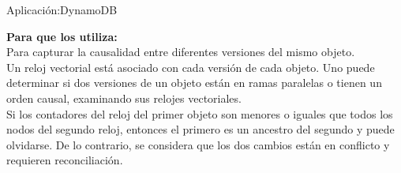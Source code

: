 \begin{frame}[fragile]{Aplicación:}{DynamoDB}
    \justifying

    {\bf Para que los utiliza:}\\[0.3cm]

    Para capturar la causalidad entre diferentes versiones del mismo objeto.\\[0.3cm]

    Un reloj vectorial está asociado con cada versión de cada objeto. Uno puede
    determinar si dos versiones de un objeto están en ramas paralelas o tienen un
    orden causal, examinando sus relojes vectoriales.\\[0.3cm]

    Si los contadores del reloj del primer objeto son menores o iguales que todos
    los nodos del segundo reloj, entonces el primero es un ancestro del segundo y
    puede olvidarse. De lo contrario, se considera que los dos cambios están en
    conflicto y requieren reconciliación.

\end{frame}
